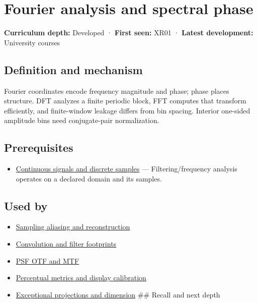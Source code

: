 \hypertarget{appendix-b60686ba06a1}{}\label{referencestart:appendix-b60686ba06a1}
\section{Fourier analysis and spectral phase}\label{appendix-b60686ba06a1-fourier-analysis-and-spectral-phase}

\textbf{Curriculum depth:} Developed · \textbf{First seen:} XR01 · \textbf{Latest development:} University courses

\subsection{Definition and mechanism}\label{appendix-b60686ba06a1-definition-and-mechanism}

Fourier coordinates encode frequency magnitude and phase; phase places structure. DFT analyzes a finite periodic block, FFT computes that transform efficiently, and finite-window leakage differs from bin spacing. Interior one-sided amplitude bins need conjugate-pair normalization.

\subsection{Prerequisites}\label{appendix-b60686ba06a1-prerequisites}

\begin{itemize}
\tightlist
\item
  \hyperref[appendix-1077ea8fc737]{Continuous signals and discrete samples} --- Filtering/frequency analysis operates on a declared domain and its samples.
\end{itemize}

\subsection{Used by}\label{appendix-b60686ba06a1-used-by}

\begin{itemize}
\item
  \hyperref[appendix-6a7869dd79a6]{Sampling aliasing and reconstruction}
\item
  \hyperref[appendix-d5b3c692d9f0]{Convolution and filter footprints}
\item
  \hyperref[appendix-8b76b0efd27f]{PSF OTF and MTF}
\item
  \hyperref[appendix-b2c1846508bf]{Perceptual metrics and display calibration}
\item
  \hyperref[appendix-3c73f7862157]{Exceptional projections and dimension} \#\# Recall and next depth
\end{itemize}

